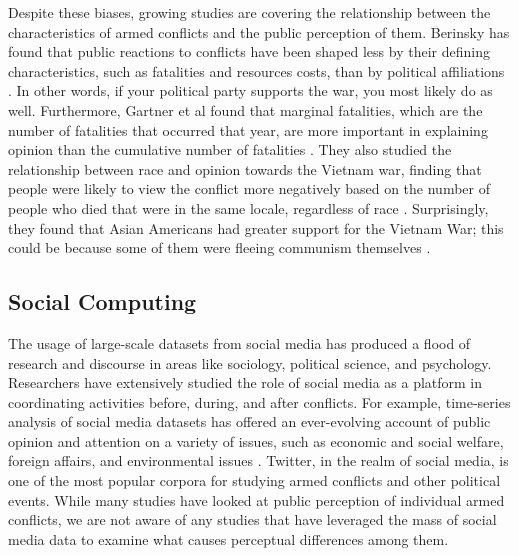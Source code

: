 Despite these biases, growing studies are covering the relationship between the characteristics of armed conflicts and the public perception of them. Berinsky has found that public reactions to conflicts have been shaped less by their defining characteristics, such as fatalities and resources costs, than by political affiliations \cite{Berinsky2009}. In other words, if your political party supports the war, you most likely do as well. Furthermore, Gartner et al found that marginal fatalities, which are the number of fatalities that occurred that year, are more important in explaining opinion than the cumulative number of fatalities \cite{Gartner1998}. They also studied the relationship between race and opinion towards the Vietnam war, finding that people were likely to view the conflict more negatively based on the number of people who died that were in the same locale, regardless of race \cite{Gartner2000}. Surprisingly, they found that Asian Americans had greater support for the Vietnam War; this could be because some of them were fleeing communism themselves \cite{Gartner2000}. 

\subsection{Social Computing}
The usage of large-scale datasets from social media has produced a flood of research and discourse in areas like sociology, political science, and psychology. Researchers have extensively studied the role of social media as a platform in coordinating activities before, during, and after conflicts. For example, time-series analysis of social media datasets has offered an ever-evolving account of public opinion and attention on a variety of issues, such as economic and social welfare, foreign affairs, and environmental issues \cite{RussellNeuman2014}. Twitter, in the realm of social media, is one of the most popular corpora for studying armed conflicts and other political events. While many studies have looked at public perception of individual armed conflicts, we are not aware of any studies that have leveraged the mass of social media data to examine what causes perceptual differences among them.
